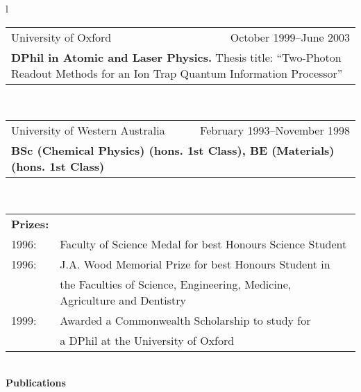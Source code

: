 \documentclass[10pt,a4paper]{article}
\makeatletter
\newcommand{\role}[5]{
\begin{tabular*}{150mm}{l@{\extracolsep{\fill}}r}
#5 & #1--#2 \\ 
\multicolumn{2}{p{140mm}}{\textbf{#3}{#4}} 
\end{tabular*}
\vspace{0.8mm}
 }
\makeatother
\begin{document}
\begin{tabular}{l}
  \role{October 1999}{June 2003} 
     {DPhil in Atomic and Laser Physics.}{ Thesis title: 
     ``Two-Photon Readout Methods for an Ion Trap Quantum Information
     Processor''}
     {University of Oxford} \\
  \role{February 1993}{November 1998}
      {BSc (Chemical Physics) (hons. 1st Class),
       BE (Materials) (hons. 1st Class)}{}
      {University of Western Australia}
    \\
    \begin{tabular*}{140mm}{ll}
      \textbf{Prizes:}\\
        1996: & Faculty of Science Medal for best Honours Science
        Student\\
        1996: & J.A. Wood Memorial Prize for best Honours Student in\\
        & the Faculties of Science, Engineering, Medicine, Agriculture
        and Dentistry\\
         1999: & Awarded a Commonwealth Scholarship to study for\\
         & a DPhil at the University of Oxford
    \end{tabular*}

\end{tabular} \\
%
{\large \textbf{Publications}}
\end{document}
